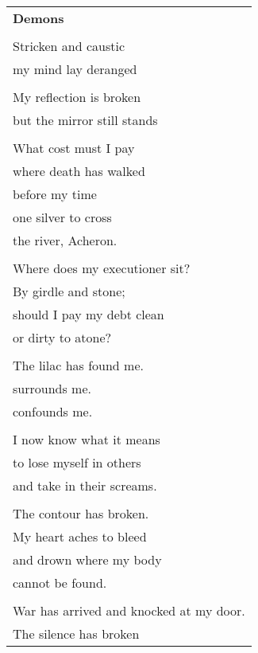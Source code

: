 \documentclass{article}
\begin{document}
\newcommand{\h}{\hspace{3ex}}
\newcommand{\hoar}{%
\begin{center}
\line(1,0){350}
\end{center}
}

\begin{center}
\begin{tabular}{l}
\textbf{Demons} \\
\\
Stricken and caustic \\
my mind lay deranged \\
\\
My reflection is broken \\
but the mirror still stands \\
\\
What cost must I pay \\
where death has walked \\
before my time \\
one silver to cross \\
the river, Acheron. \\
\\
Where does my executioner sit? \\
By girdle and stone; \\ %
should I pay my debt clean \\ %
or dirty to atone? \\ %
\\
The lilac has found me. \\
surrounds me. \\
confounds me. \\
\\
I now know what it means \\
to lose myself in others \\
and take in their screams. \\
\\
The contour has broken. \\
My heart aches to bleed \\
and drown where my body \\
cannot be found. \\
\\
War has arrived and knocked at my door. \\
The silence has broken \\

\end{tabular}
\end{center}
\end{document}
